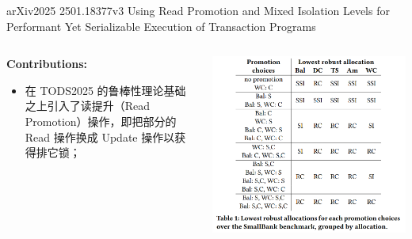 \begin{frame}{arXiv2025 2501.18377v3 Using Read Promotion and Mixed Isolation Levels for Performant Yet Serializable Execution of Transaction Programs}
	\begin{columns}
		\begin{column}{0.5\textwidth}
			\textbf{Contributions: }
			\begin{itemize}
				\item 在 TODS2025 的鲁棒性理论基础之上引入了读提升（Read Promotion）操作，即把部分的 Read 操作换成 Update 操作以获得排它锁；
			\end{itemize}
		\end{column}
		\begin{column}{0.5\textwidth}
			\includegraphics[width=0.98\linewidth]{figs/lowest-robust-allocations}
		\end{column}
	\end{columns}
\end{frame}

